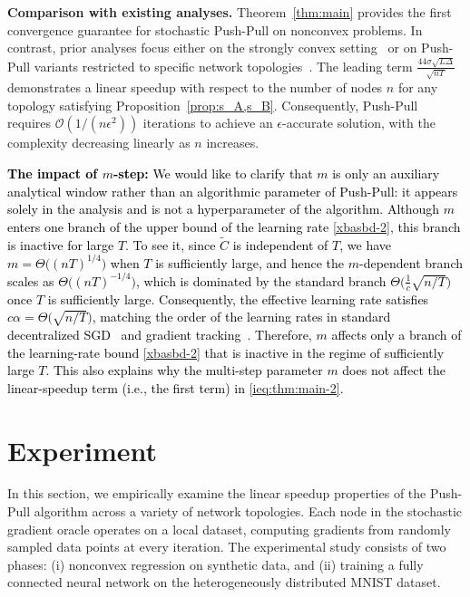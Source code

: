 \documentclass[10pt]{article}
\newcommand{\pushpull}{{\sc Push-Pull}\xspace}
\newcommand{\revision}[1]{\textcolor{black}{#1}}
\begin{document}
\noindent\textbf{Comparison with existing analyses.} Theorem~\ref{thm:main} provides the first convergence guarantee for stochastic \pushpull on nonconvex problems. In contrast, prior analyses focus either on the strongly convex setting~\cite{saadatniaki2020decentralized,xin2019SAB} or on \pushpull variants restricted to specific network topologies~\cite{you2024bary}. The leading term $\tfrac{44\sigma\sqrt{L\Delta}}{\sqrt{nT}}$ demonstrates a linear speedup with respect to the number of nodes $n$ for any topology satisfying Proposition~\ref{prop:s_A,s_B}. Consequently, \pushpull requires $\mathcal{O}(1/(n\epsilon^2))$ iterations to achieve an $\epsilon$-accurate solution, with the complexity decreasing linearly as $n$ increases.

\vspace{1mm}
\noindent \revision{\textbf{The impact of $m$-step:} We would like to clarify that $m$ is only an auxiliary analytical window rather than an algorithmic parameter of \pushpull: it appears solely in the analysis and is not a hyperparameter of the algorithm. Although $m$ enters one branch of the  upper bound of the learning rate \eqref{xbasbd-2}, this branch is inactive for large $T$. To see it, since $\tilde{C}$ is independent of $T$, we have $m = \Theta\big((nT)^{1/4}\big)$ when $T$ is sufficiently large, and hence the $m$-dependent branch scales as $\Theta\big((nT)^{-1/4}\big)$, which is dominated by the standard branch $\Theta\big(\frac{1}{c}\sqrt{n/T}\big)$ once $T$ is sufficiently large. Consequently, the effective learning rate satisfies $c\alpha = \Theta\big(\sqrt{n/T}\big)$, matching the order of the learning rates in standard decentralized SGD~\cite{koloskova2020unified} and gradient tracking~\cite[Theorem 1]{alghunaim2022unified}. Therefore, $m$ affects only a branch of the learning-rate bound \eqref{xbasbd-2} that is inactive in the regime of sufficiently large $T$. This also explains why the multi-step parameter $m$ does not affect the linear-speedup term (i.e., the first term) in \eqref{ieq:thm:main-2}.
}

\section{Experiment}\label{sec:experiment}
In this section, we empirically examine the linear speedup properties of the \pushpull algorithm across a variety of network topologies.  
Each node in the stochastic gradient oracle operates on a local dataset, computing gradients from randomly sampled data points at every iteration.  
The experimental study consists of two phases: (i) nonconvex regression on synthetic data, and (ii) training a fully connected neural network on the heterogeneously distributed MNIST dataset.  
\end{document}

